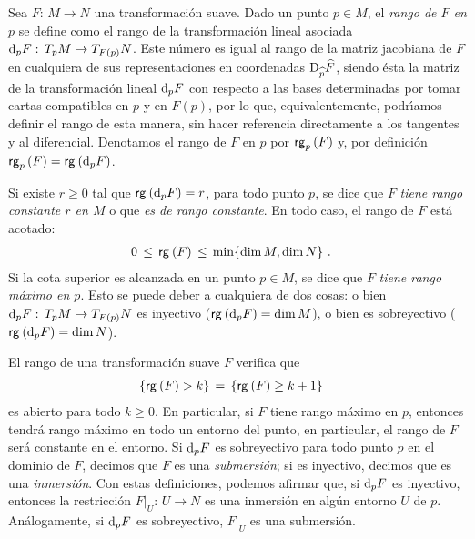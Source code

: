 \theoremstyle{plain}
\newtheorem{teoFunInvVar}{Teorema}[section]
\newtheorem{propoDifeoLocal}[teoFunInvVar]{Proposici\'{o}n}
\newtheorem{coroDifeoLocal}[teoFunInvVar]{Corolario}

\theoremstyle{remark}
\newtheorem{obsDifeoLocal}{Observaci\'{o}n}[section]


Sea $F:\,M\rightarrow N$ una transformaci\'{o}n suave. Dado un punto $p\in M$,
el \emph{rango de $F$ en $p$} se define como el rango de la transformaci\'{o}n
lineal asociada $\diferencial[p]{F}:\,T_{p}M\rightarrow T_{F(p)}N$. Este
n\'{u}mero es igual al rango de la matriz jacobiana de $F$ en cualquiera de
sus representaciones en coordenadas $\jacobiana[\widehat{p}]{\widehat{F}}$,
siendo \'{e}sta la matriz de la transformaci\'{o}n lineal $\diferencial[p]{F}$
con respecto a las bases determinadas por tomar cartas compatibles en $p$ y en
$F(p)$, por lo que, equivalentemente, podr\'{\i}amos definir el rango de
esta manera, sin hacer referencia directamente a los tangentes y al
diferencial. Denotamos el rango de $F$ en $p$ por $\rango[p]{F}$ y,
por definici\'{o}n $\rango[p]{F}=\rango{\diferencial[p]{F}}$.

Si existe $r\geq 0$ tal que $\rango{\diferencial[p]{F}}=r$, para todo punto
$p$, se dice que $F$ \emph{tiene rango constante $r$ en $M$} o que
\emph{es de rango constante}. En todo caso, el rango de $F$ est\'{a}
acotado:
\begin{align*}
	0 & \,\leq\,\rango{F}\,\leq\,\min\{\dim\,M,\dim\,N\}
	\text{ .}
\end{align*}
%
Si la cota superior es alcanzada en un punto $p\in M$, se dice que $F$
\emph{tiene rango m\'{a}ximo en $p$}. Esto se puede deber a cualquiera de
dos cosas: o bien $\diferencial[p]{F}:\,T_{p}M\rightarrow T_{F(p)}N$ es
inyectivo ($\rango{\diferencial[p]{F}}=\dim\,M$), o bien es sobreyectivo
($\rango{\diferencial[p]{F}}=\dim\,N$).

El rango de una transformaci\'{o}n suave $F$ verifica que
\begin{align*}
	\{\rango{F}>k\} & \,=\,\{\rango{F}\geq k+1\}
\end{align*}
%
es abierto para todo $k\geq 0$. En particular, si $F$ tiene rango m\'{a}ximo
en $p$, entonces tendr\'{a} rango m\'{a}ximo en todo un entorno del punto,
en particular, el rango de $F$ ser\'{a} constante en el entorno. Si
$\diferencial[p]{F}$ es sobreyectivo para todo punto $p$ en el dominio de
$F$, decimos que $F$ es una \emph{submersi\'{o}n}; si es inyectivo, decimos
que es una \emph{inmersi\'{o}n}. Con estas definiciones, podemos afirmar
que, si $\diferencial[p]{F}$ es inyectivo, entonces la restricci\'{o}n
$F|_{U}:\,U\rightarrow N$ es una inmersi\'{o}n en alg\'{u}n entorno $U$ de
$p$. An\'{a}logamente, si $\diferencial[p]{F}$ es sobreyectivo, $F|_{U}$
es una submersi\'{o}n.

